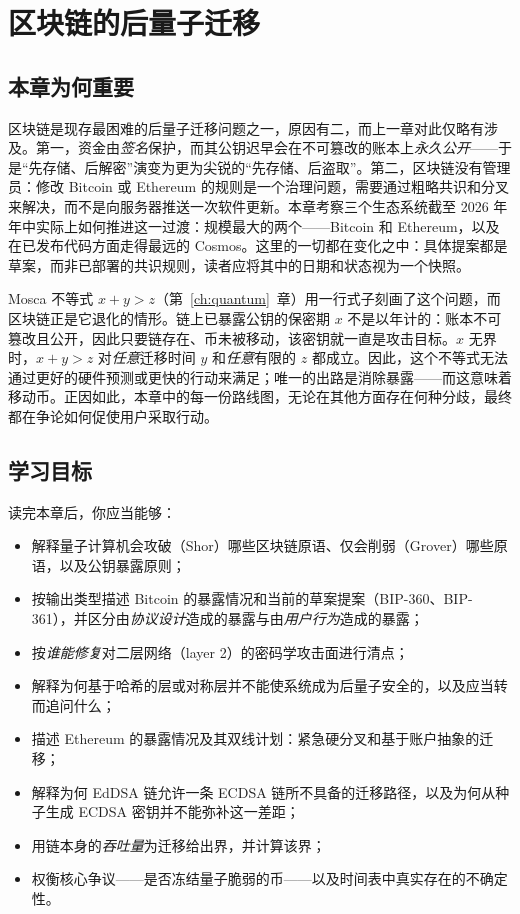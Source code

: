 \chapter{区块链的后量子迁移}
\label{ch:blockchains}

\section{本章为何重要}
区块链是现存最困难的后量子迁移问题之一，原因有二，而上一章对此仅略有涉及。第一，资金由\emph{签名}保护，而其公钥迟早会在不可篡改的账本上\emph{永久公开}——于是“先存储、后解密”演变为更为尖锐的“先存储、后盗取”。第二，区块链没有管理员：修改 Bitcoin 或 Ethereum 的规则是一个治理问题，需要通过粗略共识和分叉来解决，而不是向服务器推送一次软件更新。本章考察三个生态系统截至 2026 年年中实际上如何推进这一过渡：规模最大的两个——Bitcoin 和 Ethereum，以及在已发布代码方面走得最远的 Cosmos。这里的一切都在变化之中：具体提案都是草案，而非已部署的共识规则，读者应将其中的日期和状态视为一个快照。

Mosca 不等式 $x + y > z$（第~\ref{ch:quantum}~章）用一行式子刻画了这个问题，而区块链正是它退化的情形。链上已暴露公钥的保密期 $x$
不是以年计的：账本不可篡改且公开，因此只要链存在、币未被移动，该密钥就一直是攻击目标。$x$ 无界时，$x + y > z$ 对\emph{任意}迁移时间 $y$ 和\emph{任意}有限的 $z$ 都成立。因此，这个不等式无法通过更好的硬件预测或更快的行动来满足；唯一的出路是消除暴露——而这意味着移动币。正因如此，本章中的每一份路线图，无论在其他方面存在何种分歧，最终都在争论如何促使用户采取行动。

\section{学习目标}
读完本章后，你应当能够：

\begin{itemize}
  \item 解释量子计算机会攻破（Shor）哪些区块链原语、仅会削弱（Grover）哪些原语，以及公钥暴露原则；
  \item 按输出类型描述 Bitcoin 的暴露情况和当前的草案提案（BIP-360、BIP-361），并区分由\emph{协议设计}造成的暴露与由\emph{用户行为}造成的暴露；
  \item 按\emph{谁能修复}对二层网络（layer 2）的密码学攻击面进行清点；
  \item 解释为何基于哈希的层或对称层并不能使系统成为后量子安全的，以及应当转而追问什么；
  \item 描述 Ethereum 的暴露情况及其双线计划：紧急硬分叉和基于账户抽象的迁移；
  \item 解释为何 EdDSA 链允许一条 ECDSA 链所不具备的迁移路径，以及为何从种子生成 ECDSA 密钥并不能弥补这一差距；
  \item 用链本身的\emph{吞吐量}为迁移给出界，并计算该界；
  \item 权衡核心争议——是否冻结量子脆弱的币——以及时间表中真实存在的不确定性。
\end{itemize}

